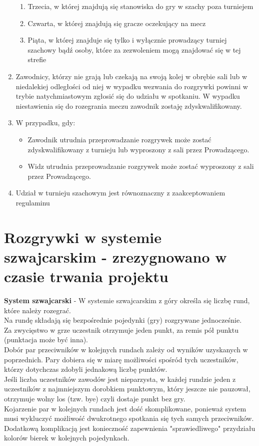 \begin{enumerate}
\begin{enumerate}
\item Trzecia, w której znajdują się stanowiska do gry w szachy poza turniejem
\item Czwarta, w której znajdują się gracze oczekujący na mecz
\item Piąta, w której znajduje się tylko i wyłącznie prowadzący turniej szachowy bądź osoby, które za zezwoleniem mogą znajdować się w tej strefie
\end{enumerate}
\item Zawodnicy, którzy nie grają lub czekają na swoją kolej w obrębie sali lub w niedalekiej odległości od niej w wypadku wezwania do rozgrywki powinni w trybie natychmiastowym zgłosić się do udziału w spotkaniu. W wypadku niestawienia się do rozegrania meczu zawodnik zostaję zdyskwalifikowany.
\item W przypadku, gdy:
\begin{itemize}
\item Zawodnik utrudnia przeprowadzanie rozgrywek może zostać zdyskwalifikowany z turnieju lub wyproszony z sali przez Prowadzącego.
\item Widz utrudnia przeprowadzanie rozgrywek może zostać wyproszony z sali przez Prowadzącego.
\end{itemize}
\item Udział w turnieju szachowym jest równoznaczny z zaakceptowaniem regulaminu
\end{enumerate}
\section{Rozgrywki w systemie szwajcarskim - zrezygnowano w czasie trwania projektu}

\textbf{System szwajcarski} - W systemie szwajcarskim z góry określa się liczbę rund, które należy rozegrać.\\
Na rundę składają się bezpośrednie pojedynki (gry) rozgrywane jednocześnie.\\ Za zwycięstwo w grze uczestnik otrzymuje jeden punkt, za remis pół punktu (punktacja może być inna).\\
Dobór par przeciwników w kolejnych rundach zależy od wyników uzyskanych w poprzednich. Pary dobiera się w miarę możliwości spośród tych uczestników, którzy dotychczas zdobyli jednakową liczbę punktów.\\
Jeśli liczba uczestników zawodów jest nieparzysta, w każdej rundzie jeden z uczestników z najmniejszym dorobkiem punktowym, który jeszcze nie pauzował, otrzymuje wolny los (tzw. bye) czyli dostaje punkt bez gry.\\
Kojarzenie par w kolejnych rundach jest dość skomplikowane, ponieważ system musi wykluczyć możliwość dwukrotnego spotkania się tych samych przeciwników.\\
Dodatkową komplikacją jest konieczność zapewnienia "sprawiedliwego" przydziału kolorów bierek w kolejnych pojedynkach.

